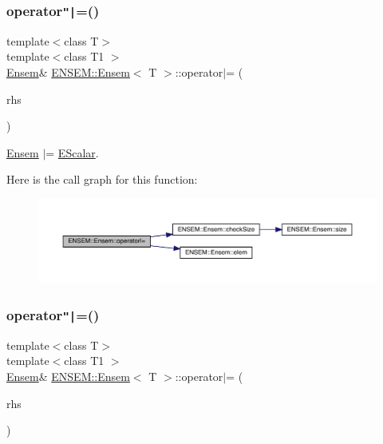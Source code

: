 \subsubsection{\texorpdfstring{operator\texttt{"|}=()}{operator|=()}\hspace{0.1cm}{\footnotesize\ttfamily [2/3]}}
{\footnotesize\ttfamily template$<$class T$>$ \\
template$<$class T1 $>$ \\
\mbox{\hyperlink{classENSEM_1_1Ensem}{Ensem}}\& \mbox{\hyperlink{classENSEM_1_1Ensem}{E\+N\+S\+E\+M\+::\+Ensem}}$<$ T $>$\+::operator$\vert$= (\begin{DoxyParamCaption}\item[{const \mbox{\hyperlink{classENSEM_1_1EScalar}{E\+Scalar}}$<$ T1 $>$ \&}]{rhs }\end{DoxyParamCaption})\hspace{0.3cm}{\ttfamily [inline]}}



\mbox{\hyperlink{classENSEM_1_1Ensem}{Ensem}} $\vert$= \mbox{\hyperlink{classENSEM_1_1EScalar}{E\+Scalar}}. 

Here is the call graph for this function\+:
\nopagebreak
\begin{figure}[H]
\begin{center}
\leavevmode
\includegraphics[width=350pt]{d7/d3e/classENSEM_1_1Ensem_aa0c3f80e393be46c6f0a1cb3bbdfb170_cgraph}
\end{center}
\end{figure}
\mbox{\label{classENSEM_1_1Ensem_aa0c3f80e393be46c6f0a1cb3bbdfb170}} 
\subsubsection{\texorpdfstring{operator\texttt{"|}=()}{operator|=()}\hspace{0.1cm}{\footnotesize\ttfamily [3/3]}}
{\footnotesize\ttfamily template$<$class T$>$ \\
template$<$class T1 $>$ \\
\mbox{\hyperlink{classENSEM_1_1Ensem}{Ensem}}\& \mbox{\hyperlink{classENSEM_1_1Ensem}{E\+N\+S\+E\+M\+::\+Ensem}}$<$ T $>$\+::operator$\vert$= (\begin{DoxyParamCaption}\item[{const \mbox{\hyperlink{classENSEM_1_1EScalar}{E\+Scalar}}$<$ T1 $>$ \&}]{rhs }\end{DoxyParamCaption})\hspace{0.3cm}{\ttfamily [inline]}}



